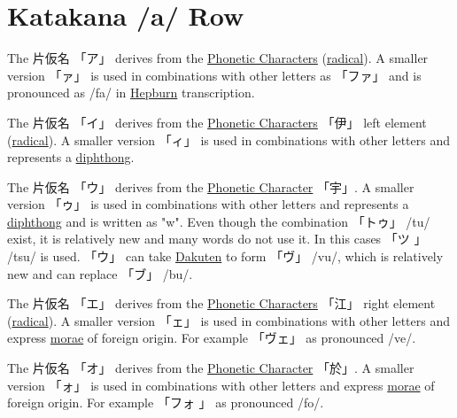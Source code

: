 \section{Katakana /a/ Row}\label{sec:KatakanaARow}


\label{letter:a} The 片仮名 {「ア」} derives from the
\hyperref[sec:PhoneticCharacter]{Phonetic Characters}
(\hyperref[sec:Radical]{radical}).  A smaller version {「ァ」} is used in
combinations with other letters as {「ファ」} and is pronounced as /fa/ in
\hyperref[sec:Hepburn]{Hepburn} transcription.

\label{letter:i} The 片仮名 {「イ」} derives from the
\hyperref[sec:PhoneticCharacter]{Phonetic Characters} {「伊」} left element
(\hyperref[sec:Radical]{radical}).  A smaller version {「ィ」} is used in
combinations with other letters and represents a
\hyperref[sec:Diphthong]{diphthong}. 

\label{letter:u} The 片仮名 {「ウ」} derives from the
\hyperref[sec:PhoneticCharacter]{Phonetic Character} {「宇」}. A smaller version
{「ゥ」} is used in combinations with other letters and represents a
\hyperref[sec:Diphthong]{diphthong} and is written as "w". Even though the
combination {「トゥ」} /tu/ exist, it is relatively new and many words do not
use it. In this cases {「ツ 」} /tsu/ is used. {「ウ」} can take
\hyperref[sec:Dakuten]{Dakuten} to form {「ヴ」} /vu/, which is relatively new
and can replace {「ブ」} /bu/. 



\newpage 

\label{letter:e} The 片仮名 {「エ」} derives from the
\hyperref[sec:PhoneticCharacter]{Phonetic Characters} {「江」} right element
(\hyperref[sec:Radical]{radical}). A smaller version {「ェ」} is used in
combinations with other letters and express \hyperref[sec:Mora]{morae} of
foreign origin. For example {「ヴェ」} as pronounced /ve/.

\label{letter:o} The 片仮名 {「オ」} derives from the
\hyperref[sec:PhoneticCharacter]{Phonetic Character} {「於」}. A smaller version
{「ォ」} is used in combinations with other letters and express
\hyperref[sec:Mora]{morae} of foreign origin. For example {「フォ 」} as
pronounced /fo/.

\newpage

